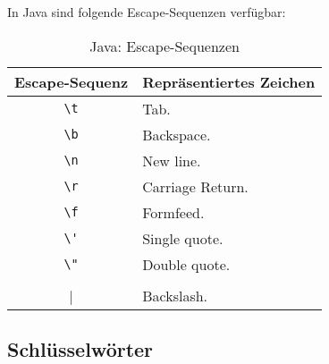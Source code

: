 		In Java sind folgende Escape-Sequenzen verfügbar:
		\begin{table}[H]
			\centering
			\begin{tabular}{c | l}
				\textbf{Escape-Sequenz} & \textbf{Repräsentiertes Zeichen} \\ \hline
				\lstinline|\t|          & Tab.                             \\
				\lstinline|\b|          & Backspace.                       \\
				\lstinline|\n|          & New line.                        \\
				\lstinline|\r|          & Carriage Return.                 \\
				\lstinline|\f|          & Formfeed.                        \\
				\lstinline|\'|          & Single quote.                    \\
				\lstinline|\"|          & Double quote.                    \\
				\lstinline|\\|          & Backslash.
			\end{tabular}
			\caption{Java: Escape-Sequenzen}
		\end{table}

\subsection{Schlüsselwörter}
	
